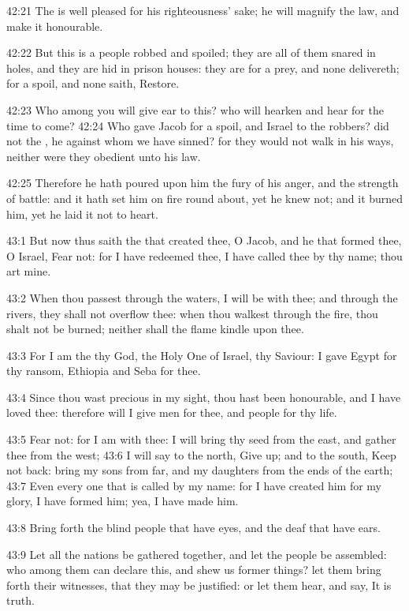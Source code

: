 42:21 The \LORD is well pleased for his righteousness' sake; he will magnify the law, and make it honourable.

42:22 But this is a people robbed and spoiled; they are all of them snared in holes, and they are hid in prison houses: they are for a prey, and none delivereth; for a spoil, and none saith, Restore.

42:23 Who among you will give ear to this? who will hearken and hear for the time to come?  42:24 Who gave Jacob for a spoil, and Israel to the robbers? did not the \LORD, he against whom we have sinned? for they would not walk in his ways, neither were they obedient unto his law.

42:25 Therefore he hath poured upon him the fury of his anger, and the strength of battle: and it hath set him on fire round about, yet he knew not; and it burned him, yet he laid it not to heart.

43:1 But now thus saith the \LORD that created thee, O Jacob, and he that formed thee, O Israel, Fear not: for I have redeemed thee, I have called thee by thy name; thou art mine.

43:2 When thou passest through the waters, I will be with thee; and through the rivers, they shall not overflow thee: when thou walkest through the fire, thou shalt not be burned; neither shall the flame kindle upon thee.

43:3 For I am the \LORD thy God, the Holy One of Israel, thy Saviour: I gave Egypt for thy ransom, Ethiopia and Seba for thee.

43:4 Since thou wast precious in my sight, thou hast been honourable, and I have loved thee: therefore will I give men for thee, and people for thy life.

43:5 Fear not: for I am with thee: I will bring thy seed from the east, and gather thee from the west; 43:6 I will say to the north, Give up; and to the south, Keep not back: bring my sons from far, and my daughters from the ends of the earth; 43:7 Even every one that is called by my name: for I have created him for my glory, I have formed him; yea, I have made him.

43:8 Bring forth the blind people that have eyes, and the deaf that have ears.

43:9 Let all the nations be gathered together, and let the people be assembled: who among them can declare this, and shew us former things?  let them bring forth their witnesses, that they may be justified: or let them hear, and say, It is truth.

